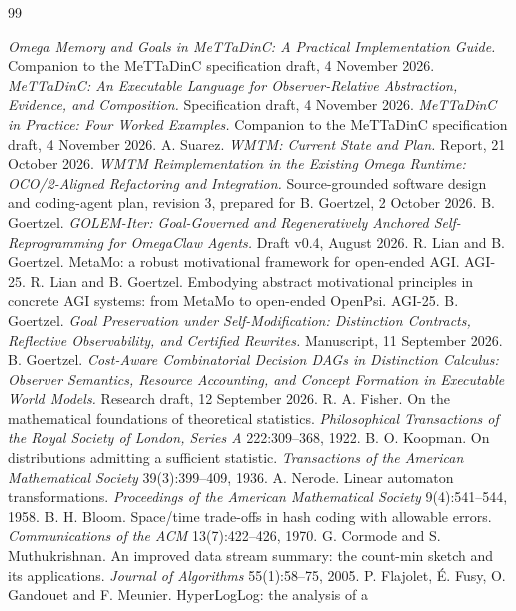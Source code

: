 \documentclass[11pt]{article}
\theoremstyle{definition}
\theoremstyle{plain}
\begin{document}
\begin{thebibliography}{99}\small
{}
 \emph{Omega Memory and Goals in MeTTaDinC: A Practical Implementation Guide.} Companion
to the MeTTaDinC specification draft, 4 November 2026.
 \emph{MeTTaDinC: An Executable Language for Observer-Relative Abstraction, Evidence,
and Composition.} Specification draft, 4 November 2026.
 \emph{MeTTaDinC in Practice: Four Worked Examples.} Companion to the MeTTaDinC
specification draft, 4 November 2026.
 A. Suarez. \emph{WMTM: Current State and Plan.} Report, 21 October 2026.
 \emph{WMTM Reimplementation in the Existing Omega Runtime: OCO/2-Aligned Refactoring
and Integration.} Source-grounded software design and coding-agent plan, revision 3, prepared for
B. Goertzel, 2 October 2026.
 B. Goertzel. \emph{GOLEM-Iter: Goal-Governed and Regeneratively Anchored
Self-Reprogramming for OmegaClaw Agents.} Draft v0.4, August 2026.
 R. Lian and B. Goertzel. MetaMo: a robust motivational framework for open-ended
AGI. AGI-25.
 R. Lian and B. Goertzel. Embodying abstract motivational principles in concrete
AGI systems: from MetaMo to open-ended OpenPsi. AGI-25.
 B. Goertzel. \emph{Goal Preservation under Self-Modification: Distinction
Contracts, Reflective Observability, and Certified Rewrites.} Manuscript, 11 September 2026.
 B. Goertzel. \emph{Cost-Aware Combinatorial Decision DAGs in Distinction Calculus:
Observer Semantics, Resource Accounting, and Concept Formation in Executable World Models.} Research
draft, 12 September 2026.
 R. A. Fisher. On the mathematical foundations of theoretical statistics.
\emph{Philosophical Transactions of the Royal Society of London, Series A} 222:309--368, 1922.
 B. O. Koopman. On distributions admitting a sufficient statistic.
\emph{Transactions of the American Mathematical Society} 39(3):399--409, 1936.
 A. Nerode. Linear automaton transformations. \emph{Proceedings of the American
Mathematical Society} 9(4):541--544, 1958.
 B. H. Bloom. Space/time trade-offs in hash coding with allowable errors.
\emph{Communications of the ACM} 13(7):422--426, 1970.
 G. Cormode and S. Muthukrishnan. An improved data stream summary: the count-min
sketch and its applications. \emph{Journal of Algorithms} 55(1):58--75, 2005.
 P. Flajolet, \'E. Fusy, O. Gandouet and F. Meunier. HyperLogLog: the analysis of a

\end{thebibliography}
\end{document}
